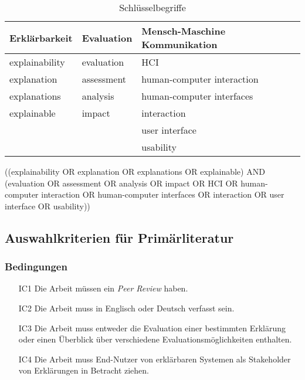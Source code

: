 \begin{table}[htb!]
    \begin{tabular}{p{}p{}p{}}
        \hline
        Erklärbarkeit  & Evaluation & Mensch-Maschine Kommunikation             \\
        \toprule
        explainability          & evaluation    & HCI\\
        explanation             & assessment    & human-computer interaction    \\
        explanations            & analysis      & human-computer interfaces     \\
        explainable             & impact        & interaction                   \\
                                &               & user interface                \\
                                &               & usability                     \\              
        \toprule
    \end{tabular}
\caption{Schlüsselbegriffe}
\label{tab:search_terms}
\end{table}

((explainability OR explanation OR explanations OR explainable) AND (evaluation OR assessment OR analysis OR impact OR HCI OR \glqq human-computer interaction\grqq{} OR \glqq human-computer interfaces \grqq{} OR interaction OR \glqq user interface\grqq{} OR usability))



\subsection{Auswahlkriterien für Primärliteratur}

\subsubsection{Bedingungen}

\begin{enumerate}
    \item[IC1] Die Arbeit müssen ein \textit{Peer Review} haben.
    \item[IC2] Die Arbeit muss in Englisch oder Deutsch verfasst sein.
    \item[IC3] Die Arbeit muss entweder die Evaluation einer bestimmten Erklärung oder einen Überblick über verschiedene Evaluationsmöglichkeiten enthalten.
    \item[IC4] Die Arbeit muss End-Nutzer von erklärbaren Systemen als Stakeholder von Erklärungen in Betracht ziehen.
\end{enumerate}


